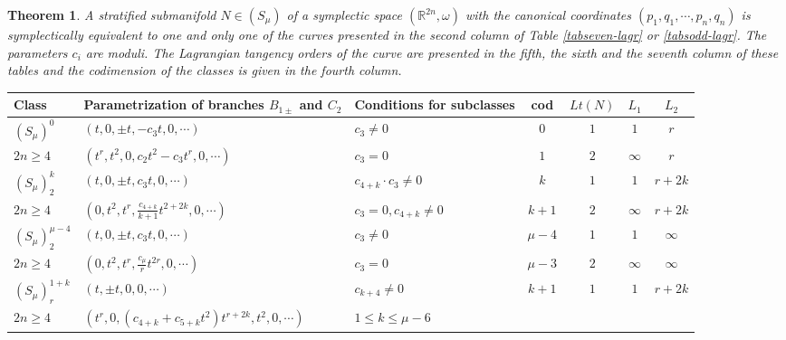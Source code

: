 \documentclass{amsart}
\newtheorem{thm}{Theorem}[section]
\theoremstyle{definition}
\numberwithin{equation}{section}
\begin{document}
\begin{thm}
\label{lagr-s} A stratified submanifold $N\in (S_{\mu})$ of a
symplectic space $(\mathbb R^{2n}, \omega )$ with the canonical
coordinates $(p_1, q_1, \cdots, p_n, q_n)$ is symplectically
equivalent to one and only one of the curves presented in the
second column of Table \ref{tabseven-lagr} or \ref{tabsodd-lagr}. The parameters $c_i$ are moduli. The Lagrangian tangency orders of the curve are presented in  the fifth, the sixth and the seventh column of these tables and the codimension of the classes is given in the fourth column.
\end{thm}

\setlength{\tabcolsep}{1mm}

\begin{center}
\begin{table}[h]

    \begin{small}
    \noindent
    \begin{tabular}{|p{1.3cm}|p{4.6cm}|p{2.3cm}|c|c|c|c|}
                    \hline
    Class &  Parametrization  of branches \newline $B_{1\pm}$ and $C_2$ & Conditions \newline for subclasses  & cod & $Lt(N)$   &  $L_1$ & $L_2$ \\ \hline

        $(S_{\mu})^0$ & $(t,0,\pm t,-c_3t,0,\cdots )$ & $c_3\ne 0$& $0$ & $1$ & $1$ & $r$ \\ \cline{3-7}
     $2n\ge 4$ & $(t^r\!,t^2\!,0,c_2t^2\!-c_3t^r\!,0,\cdots )$ & $c_3=0$ & $1$ & $2$ & $\infty$ & $r$ \\ \hline

$(S_{\mu})^{k}_2$  & $(t,0, \pm t, c_3 t,0,\cdots)$ &  $c_{4+k}\cdot c_3\!\ne\!0$ & $k$ & $1$ & $1$ & $r\!+\!2k$   \\ \cline{3-7}
$2n\ge 4$  & $(0,t^2,t^r, \frac{c_{4+k}}{k+1} t^{2+2k}, 0,\cdots)$ & $c_3\!=0, c_{4+k}\!\ne 0$  & $k\!+\!1$ & $2$ & $\infty$  & $r\!+\!2k$ \\ \hline

$(S_{\mu})^{\mu-4}_2$  & $(t,0, \pm t, c_3 t,0,\cdots)$ & $c_3\ne 0$   & $\mu\!-\!4$ & $1$ & $1$ & $\infty$   \\ \cline{3-7}
$2n\ge 4$  & $(0,t^2,t^r, \frac{c_{\mu}}{r} t^{2r}, 0,\cdots)$ & $c_3=0$ & $\mu\!-\!3$ & $2$  & $\infty$ & $\infty$ \\ \hline

    $(S_{\mu})^{1+\!k}_r$ & $(t, \pm t, 0, 0,\cdots)$ & $c_{k+4}\ne 0$ & $k\!+\!1$ & $1$ & $1$ & $r\!+\!2k$ \\
    $2n\ge 4$ & $(t^r\!,\! 0,\! (c_{4\!+\!k}\!+\!c_{5\!+\!k}t^2)t^{r+2k}\!,t^2\!, 0,\!\cdots)$ & $1\!\leq k \leq \mu\! -6$  &   &  &  &  \\ \hline


\end{tabular}
\end{small}
\end{table}
\end{center}
\end{document}
